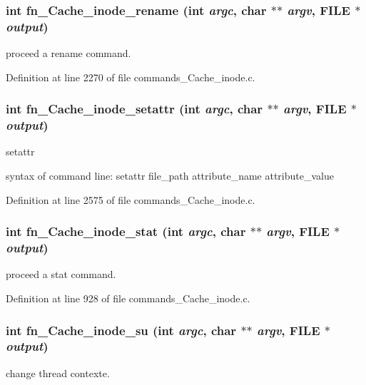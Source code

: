 \subsubsection[{fn\_\-Cache\_\-inode\_\-rename}]{\setlength{\rightskip}{0pt plus 5cm}int fn\_\-Cache\_\-inode\_\-rename (int {\em argc}, \/  char $\ast$$\ast$ {\em argv}, \/  FILE $\ast$ {\em output})}\label{commands__Cache__inode_8c_a616439560ee7cd599d64c3de8b55b36d}
proceed a rename command. 

Definition at line 2270 of file commands\_\-Cache\_\-inode.c.
\subsubsection[{fn\_\-Cache\_\-inode\_\-setattr}]{\setlength{\rightskip}{0pt plus 5cm}int fn\_\-Cache\_\-inode\_\-setattr (int {\em argc}, \/  char $\ast$$\ast$ {\em argv}, \/  FILE $\ast$ {\em output})}\label{commands__Cache__inode_8c_a9e606e96829ada43c70f227cd6b9cd52}
setattr

syntax of command line: setattr file\_\-path attribute\_\-name attribute\_\-value 

Definition at line 2575 of file commands\_\-Cache\_\-inode.c.
\subsubsection[{fn\_\-Cache\_\-inode\_\-stat}]{\setlength{\rightskip}{0pt plus 5cm}int fn\_\-Cache\_\-inode\_\-stat (int {\em argc}, \/  char $\ast$$\ast$ {\em argv}, \/  FILE $\ast$ {\em output})}\label{commands__Cache__inode_8c_a4cd5ca6eb69f06e858fc1ff59837dcce}
proceed a stat command. 

Definition at line 928 of file commands\_\-Cache\_\-inode.c.
\subsubsection[{fn\_\-Cache\_\-inode\_\-su}]{\setlength{\rightskip}{0pt plus 5cm}int fn\_\-Cache\_\-inode\_\-su (int {\em argc}, \/  char $\ast$$\ast$ {\em argv}, \/  FILE $\ast$ {\em output})}\label{commands__Cache__inode_8c_ae03b408b9dc4ff37949b4b761be07a08}
change thread contexte. 

